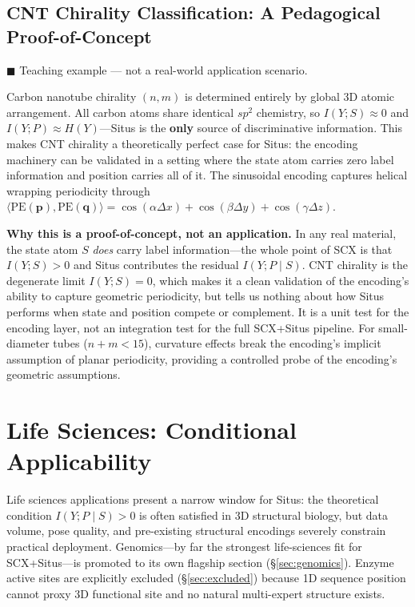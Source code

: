 \documentclass[12pt,a4paper]{article}
\begin{document}
\subsection{CNT Chirality Classification: A Pedagogical Proof-of-Concept}

\textcolor{projected}{$\blacksquare$ Teaching example — not a real-world application scenario.}

Carbon nanotube chirality $(n,m)$ is determined entirely by global 3D atomic arrangement. All carbon atoms share identical $sp^2$ chemistry, so $I(Y; S) \approx 0$ and $I(Y; P) \approx H(Y)$---Situs is the \textbf{only} source of discriminative information. This makes CNT chirality a theoretically perfect case for Situs: the encoding machinery can be validated in a setting where the state atom carries zero label information and position carries all of it. The sinusoidal encoding captures helical wrapping periodicity through $\langle \mathrm{PE}(\mathbf{p}), \mathrm{PE}(\mathbf{q}) \rangle = \cos(\alpha\Delta x) + \cos(\beta\Delta y) + \cos(\gamma\Delta z)$.

\textbf{Why this is a proof-of-concept, not an application.} In any real material, the state atom $S$ \emph{does} carry label information---the whole point of SCX is that $I(Y;S) > 0$ and Situs contributes the residual $I(Y;P \mid S)$. CNT chirality is the degenerate limit $I(Y;S) = 0$, which makes it a clean validation of the encoding's ability to capture geometric periodicity, but tells us nothing about how Situs performs when state and position compete or complement. It is a unit test for the encoding layer, not an integration test for the full SCX+Situs pipeline. For small-diameter tubes ($n+m < 15$), curvature effects break the encoding's implicit assumption of planar periodicity, providing a controlled probe of the encoding's geometric assumptions.

\section{Life Sciences: Conditional Applicability}
\label{sec:lifesci}

Life sciences applications present a narrow window for Situs: the theoretical condition $I(Y;P \mid S) > 0$ is often satisfied in 3D structural biology, but data volume, pose quality, and pre-existing structural encodings severely constrain practical deployment. Genomics---by far the strongest life-sciences fit for SCX+Situs---is promoted to its own flagship section (\S\ref{sec:genomics}). Enzyme active sites are explicitly excluded (\S\ref{sec:excluded}) because 1D sequence position cannot proxy 3D functional site and no natural multi-expert structure exists.
\end{document}
